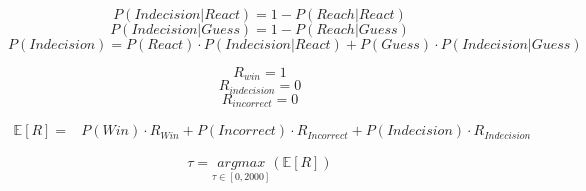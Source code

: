 \documentclass[12pt,letterpaper]{article}
\begin{document}
\begin{equation}
    P(Indecision|React) = 1 - P(Reach|React)
\end{equation}
\begin{equation}
    P(Indecision|Guess) = 1 - P(Reach|Guess)
\end{equation}
\begin{equation}
    P(Indecision) = P(React) \cdot P(Indecision|React) + P(Guess) \cdot P(Indecision|Guess) 
\end{equation}

\begin{equation}
    R_{win} = 1
\end{equation}
\begin{equation}
    R_{indecision} = 0
\end{equation}
\begin{equation}
    R_{incorrect} = 0
\end{equation}

\begin{align}
    \mathbb{E}[R] = & P(Win) \cdot R_{Win} + P(Incorrect) \cdot R_{Incorrect} + P(Indecision) \cdot R_{Indecision}
\end{align}

\begin{equation}
    \tau = \underset{\tau \in [0,2000]}{argmax}(\mathbb{E}[R])
\end{equation}
\end{document}

